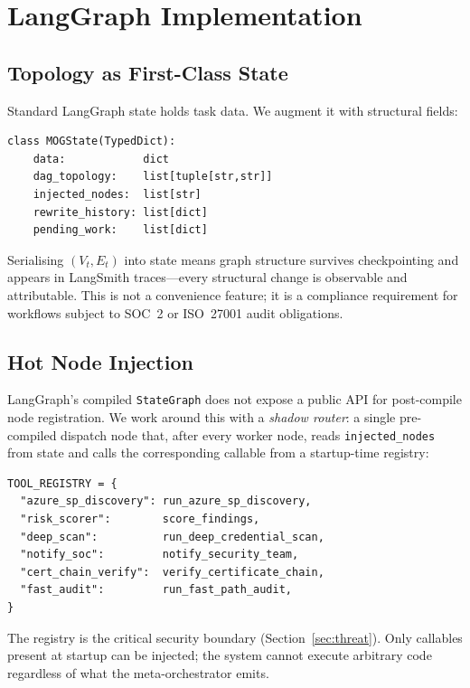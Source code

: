 \documentclass[conference]{IEEEtran}
\begin{document}
\section{LangGraph Implementation}
\label{sec:impl}

\subsection{Topology as First-Class State}

Standard LangGraph state holds task data. We augment it with
structural fields:

\begin{verbatim}
class MOGState(TypedDict):
    data:            dict
    dag_topology:    list[tuple[str,str]]
    injected_nodes:  list[str]
    rewrite_history: list[dict]
    pending_work:    list[dict]
\end{verbatim}

Serialising $(V_t,E_t)$ into state means graph structure survives
checkpointing and appears in LangSmith traces---every structural
change is observable and attributable. This is not a convenience
feature; it is a compliance requirement for workflows subject to
SOC~2 or ISO~27001 audit obligations.

\subsection{Hot Node Injection}

LangGraph's compiled \texttt{StateGraph} does not expose a public API
for post-compile node registration. We work around this with a
\emph{shadow router}: a single pre-compiled dispatch node that, after
every worker node, reads \texttt{injected\_nodes} from state and
calls the corresponding callable from a startup-time registry:

\begin{verbatim}
TOOL_REGISTRY = {
  "azure_sp_discovery": run_azure_sp_discovery,
  "risk_scorer":        score_findings,
  "deep_scan":          run_deep_credential_scan,
  "notify_soc":         notify_security_team,
  "cert_chain_verify":  verify_certificate_chain,
  "fast_audit":         run_fast_path_audit,
}
\end{verbatim}

The registry is the critical security boundary (Section~\ref{sec:threat}).
Only callables present at startup can be injected; the system cannot
execute arbitrary code regardless of what the meta-orchestrator emits.
\end{document}

